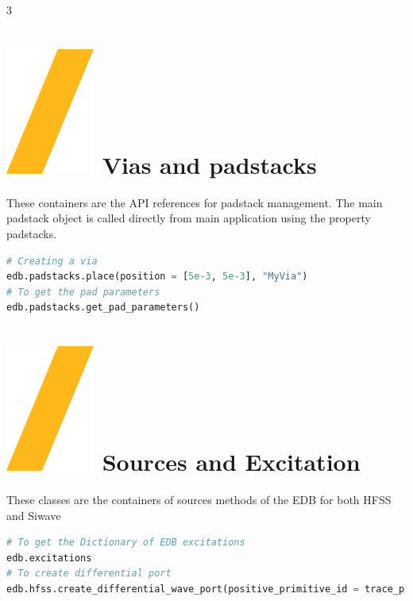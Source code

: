 \documentclass[landscape]{article}
\begin{document}
\begin{multicols}{3}
\section{\includegraphics[height=\fontcharht\font`\S]{slash.png} Vias and padstacks}
These containers are the API references for padstack management. The main padstack object is called directly from main application using the property padstacks.
\begin{lstlisting}[language=Python]
# Creating a via
edb.padstacks.place(position = [5e-3, 5e-3], "MyVia")
# To get the pad parameters
edb.padstacks.get_pad_parameters()
\end{lstlisting}

\section{\includegraphics[height=\fontcharht\font`\S]{slash.png} Sources and Excitation}
These classes are the containers of sources methods of the EDB for both HFSS and Siwave

\begin{lstlisting}[language=Python]
# To get the Dictionary of EDB excitations
edb.excitations
# To create differential port
edb.hfss.create_differential_wave_port(positive_primitive_id = trace_p[0].id, positive_points_on_edge = p1_points, negative_primitive_id = trace_n[0].id, negative_points_on_edge = n1_points, name = "wave_port_1")



\end{lstlisting}
\end{multicols}
\end{document}
